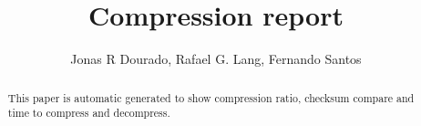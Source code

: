 \documentclass[a4paper,10pt]{report}
\title{Compression report}
\author{Jonas R Dourado, Rafael G. Lang, Fernando Santos}
\begin{document}
\maketitle

\begin{abstract}
  This paper is automatic generated to show compression ratio, checksum compare and time to compress and decompress.
\end{abstract}


\end{document}
